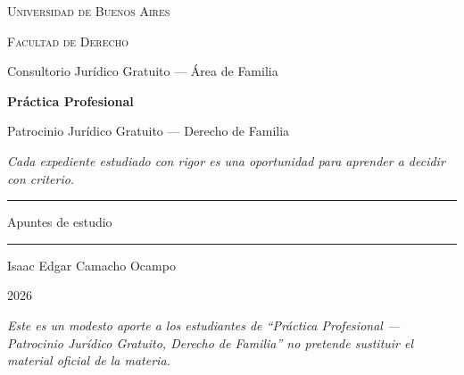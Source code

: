 \documentclass[12pt,oneside]{book}
\newcommand{\universidad}{Universidad de Buenos Aires}
\newcommand{\facultad}{Facultad de Derecho}
\newcommand{\carrera}{Consultorio Jurídico Gratuito --- Área de Familia}
\newcommand{\materia}{Práctica Profesional}
\newcommand{\materiacompleta}{Práctica Profesional --- Patrocinio Jurídico Gratuito, Derecho de Familia}
\newcommand{\titulo}{Patrocinio Jurídico Gratuito --- Derecho de Familia}
\newcommand{\autor}{Isaac Edgar Camacho Ocampo}
\newcommand{\anio}{2026}
\begin{document}

\frontmatter

\begin{titlepage}

\thispagestyle{empty}

\begin{center}

\vspace*{1cm}

{\large \textsc{\universidad}}

\vspace{0.2cm}

{\large \textsc{\facultad}}

\vspace{0.2cm}

{\large \carrera}

\vspace{3cm}

{\Huge \textbf{\materia}}

\vspace{1cm}

{\LARGE \titulo}

\vspace{0.8cm}

\textit{Cada expediente estudiado con rigor es una oportunidad para aprender a decidir con criterio.}

\vspace{1.2cm}

\rule{0.70\textwidth}{0.5pt}

\vspace{0.5cm}

{\large Apuntes de estudio}

\vspace{0.5cm}

\rule{0.70\textwidth}{0.5pt}

\vfill

{\large \autor}

\vspace{0.3cm}

{\large \anio}

\end{center}

\vfill

\begin{flushleft}
\textit{Este es un modesto aporte a los estudiantes de ``\materiacompleta'' no pretende sustituir el material oficial de la materia.}
\end{flushleft}

\end{titlepage}
\end{document}
